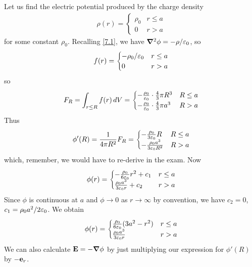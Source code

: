 \documentclass{../../template/note}
\begin{document}
    \begin{example*}
        Let us find the electric potential produced by the charge density
        \begin{align*}
            \rho(r) = \begin{cases}
                \rho_0 & r \leq a \\
                0 & r > a
            \end{cases}
        \end{align*}
        for some constant \(\rho_0\). Recalling \cref{7.1}, we have \(\grad^2 \phi = -\rho/\eps_0\), so
        \begin{align*}
            f(r) = \begin{cases}
                -\rho_0/\varepsilon_0 & r \leq a \\
                0 & r > a
            \end{cases}
        \end{align*}
        so
        \begin{align*}
            F_R = \int_{r \leq R} f(r) \,d{V} = \begin{cases}
                -\frac{\rho_0}{\varepsilon_0} \cdot \frac 4 3 \pi R^3 & R \leq a \\
                -\frac{\rho_0}{\varepsilon_0} \cdot \frac 4 3 \pi a^3 & R > a
            \end{cases}
        \end{align*}
        Thus
        \begin{align*}
            \phi'(R) = \frac 1{4\pi R^2}F_R = \begin{cases}
                -\frac{\rho_0}{3\varepsilon_0}R & R \leq a \\
                -\frac{\rho_0a^3}{3\varepsilon_0R^2} & R > a
            \end{cases}
        \end{align*}
        which, remember, we would have to re-derive in the exam. Now
        \begin{align*}
            \phi(r) = \begin{cases}
                -\frac{\rho_0}{6\varepsilon_0}r^2 + c_1 & r \leq a \\
                \frac{\rho_0a^3}{3\varepsilon_0r} + c_2 & r > a
            \end{cases}
        \end{align*}
        Since \(\phi\) is continuous at \(a\) and \(\phi \to 0\) as \(r \to \infty\) by convention, we have \(c_2 = 0\), \(c_1 = \rho_0a^2/2\varepsilon_0\). We obtain
        \begin{align*}
            \phi(r) = \begin{cases}
                \frac{\rho_0}{6\varepsilon_0}(3a^2-r^2) & r \leq a \\
                \frac{\rho_0a^3}{3\varepsilon_0r} & r > a
            \end{cases}
        \end{align*}
        We can also calculate \(\V E = -\grad \phi\) by just multiplying our expression for \(\phi'(R)\) by \(-\V e_r\).
    \end{example*}
    
\end{document}
